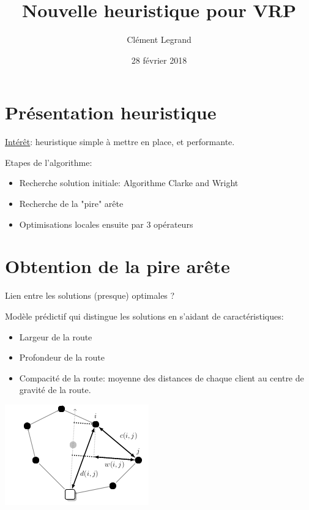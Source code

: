 \documentclass{beamer}
\title{Nouvelle heuristique pour VRP}
\author{Clément Legrand}
\date{28 février 2018}
\begin{document}
\section{Présentation heuristique}

\begin{frame}[plain]
\titlepage
\end{frame}

\begin{frame}
\underline{Intérêt}: heuristique simple à mettre en place, et performante.

Etapes de l'algorithme:
\begin{itemize}
\item Recherche solution initiale: Algorithme Clarke and Wright

\item Recherche de la "pire" arête

\item Optimisations locales ensuite par 3 opérateurs
\end{itemize}

\end{frame}

\section{Obtention de la pire arête}

\begin{frame}
Lien entre les solutions (presque) optimales ? 

Modèle prédictif qui distingue les solutions en s'aidant de caractéristiques:
\begin{itemize}
\item Largeur de la route
\item Profondeur de la route
\item Compacité de la route: moyenne des distances de chaque client au centre de gravité de la route.
\end{itemize}

	\centering
	\includegraphics[height=0.4\textheight]{metrics.png}
	
\end{frame}
\end{document}
